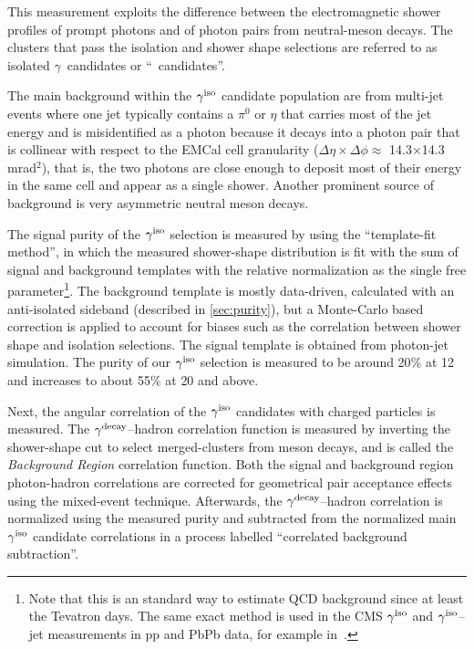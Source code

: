 This measurement exploits the difference between the electromagnetic shower profiles of prompt photons and of photon pairs from neutral-meson decays. The clusters that pass the isolation and shower shape selections are referred to as isolated $\gamma$~candidates or ``\gammaiso~candidates''. 

The main background within the $\gamma^\mathrm{iso}$ candidate population are from multi-jet events where one jet typically contains a $\pi^{0}$ or $\eta$ that carries most of the jet energy and is misidentified as a photon because it decays into a photon pair that is collinear with respect to the EMCal cell granularity ($\Delta\eta\times\Delta\phi\approx$  14.3$\times$14.3 mrad$^{2}$), that is, the two photons are close enough to deposit most of their energy in the same cell and appear as a single shower. Another prominent source of background is very asymmetric neutral meson decays.

The signal purity of the $\gamma^\mathrm{iso}$ selection is measured by using the ``template-fit method'', in which the measured shower-shape distribution is fit with the sum of signal and background templates with the relative normalization as the single free parameter\footnote{Note that this is an standard way to estimate QCD background since at least the Tevatron days. The same exact method is used in the CMS $\gamma^\mathrm{iso}$ and $\gamma^\mathrm{iso}$--jet measurements in pp and PbPb data, for example in~\cite{Sirunyan:2018gro,Chatrchyan:2012gt}.}. The background template is mostly data-driven, calculated with an anti-isolated sideband (described in \ref{sec:purity}), but a Monte-Carlo based correction is applied to account for biases such as the correlation between shower shape and isolation selections. The signal template is obtained from photon-jet simulation. The purity of our $\gamma^\mathrm{iso}$ selection is measured to be around 20$\%$ at {12 \GeVc} and increases to about 55$\%$ at {20 \GeVc} and above. 

Next, the angular correlation of the $\gamma^\mathrm{iso}$ candidates with charged particles is measured.  The {$\gamma^\mathrm{decay}$--hadron} correlation function is measured by inverting the shower-shape cut to select merged-clusters from meson decays, and is called the \textit{Background Region} correlation function. Both the signal and background region photon-hadron correlations are corrected for geometrical pair acceptance effects using the mixed-event technique. Afterwards, the $\gamma^\mathrm{decay}$--hadron correlation is normalized using the measured purity and subtracted from the normalized main $\gamma^\mathrm{iso}$ candidate correlations in a process labelled ``correlated background subtraction''.

